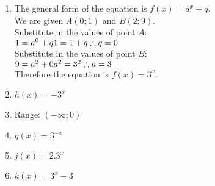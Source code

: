\begin{solutions}{}
{\begin{enumerate}[noitemsep, label=\textbf{\arabic*}. ]
\begin{enumerate}[noitemsep, label=\textbf{(\alph*)} ]
\item %
The general form of the equation is $f(x)=a^x+q$. \\
We are given $A(0; 1)$ and $B(2; 9)$.\\
Substitute in the values of point $A$:\\
$1 = a^0 +q\\
1 = 1 +q\\
\therefore q=0$\\
Substitute in the values of point $B$:\\
$9=a^2+0\\
a^2=3^2\\
\therefore a=3$\\
Therefore the equation is $f(x) = 3^x$.
\item $h(x)=-3^{x}$%
\item Range: $(-\infty;0)$%
\item $g(x)=3^{-x}$%
\item $j(x)=2.3^{x}$%
\item $k(x)=3^{x}-3$%
\end{enumerate}
\end{enumerate}

}
\end{solutions}


